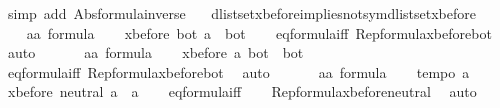 \begin{isabellebody}
\ {\isacharparenleft}simp\ add{\isacharcolon}\ Abs{\isacharunderscore}formula{\isacharunderscore}inverse\ \isanewline
\ \ dlistset{\isacharunderscore}xbefore{\isacharunderscore}implies{\isacharunderscore}not{\isacharunderscore}sym{\isacharunderscore}dlistset{\isacharunderscore}xbefore{\isacharparenright}%
\endisatagproof
{\isafoldproof}%
%
\isadelimproof
\isanewline
%
\endisadelimproof
\isanewline
{}\isamarkupfalse%
%
\isadelimproof
\ %
\endisadelimproof
%
\isatagproof
{}\isamarkupfalse%
\isanewline
\ \ \isamarkupfalse%
\ a{\isacharcolon}{\isacharcolon}{\isachardoublequoteopen}{\isacharprime}a\ formula{\isachardoublequoteclose}\isanewline
\ \ \isamarkupfalse%
\ {\isachardoublequoteopen}xbefore\ bot\ a\ {\isacharequal}\ bot{\isachardoublequoteclose}\isanewline
\ \ \isamarkupfalse%
\ eq{\isacharunderscore}formula{\isacharunderscore}iff\ Rep{\isacharunderscore}formula{\isacharunderscore}xbefore{\isacharunderscore}bot{\isacharunderscore}{}\ \isamarkupfalse%
\ auto\isanewline
\ \ \isamarkupfalse%
\isanewline
\ \ \isamarkupfalse%
\ a{\isacharcolon}{\isacharcolon}{\isachardoublequoteopen}{\isacharprime}a\ formula{\isachardoublequoteclose}\isanewline
\ \ \isamarkupfalse%
\ {\isachardoublequoteopen}xbefore\ a\ bot\ {\isacharequal}\ bot{\isachardoublequoteclose}\isanewline
\ \ \isamarkupfalse%
\ eq{\isacharunderscore}formula{\isacharunderscore}iff\ Rep{\isacharunderscore}formula{\isacharunderscore}xbefore{\isacharunderscore}bot{\isacharunderscore}{}\ \isamarkupfalse%
\ auto\isanewline
\ \ \isamarkupfalse%
\isanewline
\ \ \isamarkupfalse%
\ a{\isacharcolon}{\isacharcolon}{\isachardoublequoteopen}{\isacharprime}a\ formula{\isachardoublequoteclose}\isanewline
\ \ \isamarkupfalse%
\ {\isachardoublequoteopen}tempo{}\ a{\isachardoublequoteclose}\isanewline
\ \ \isamarkupfalse%
\ {\isachardoublequoteopen}xbefore\ neutral\ a\ {\isacharequal}\ a{\isachardoublequoteclose}\isanewline
\ \ \isamarkupfalse%
\ eq{\isacharunderscore}formula{\isacharunderscore}iff\isanewline
\ \ \isamarkupfalse%
\ Rep{\isacharunderscore}formula{\isacharunderscore}xbefore{\isacharunderscore}neutral{\isacharunderscore}{}\ \isamarkupfalse%
\ auto\isanewline
\ \ \isamarkupfalse%
\isanewline
\ \ \isamarkupfalse%

\end{isabellebody}
